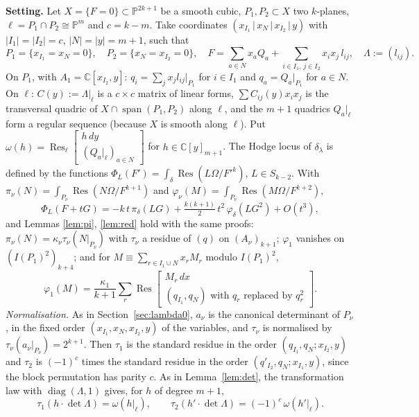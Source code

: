 \documentclass[10pt]{article}
\numberwithin{equation}{section}
\theoremstyle{remark}
\newcommand{\PP}{\mathbb{P}}
\newcommand{\CC}{\mathbb{C}}
\newcommand{\Res}{\operatorname{Res}}
\newcommand{\gres}[2]{\Res\!\begin{bmatrix} #1 \\ #2 \end{bmatrix}}
\newcommand{\lres}[2]{\Res_\ell\!\begin{bmatrix} #1 \\ #2 \end{bmatrix}}
\newcommand{\run}[1]{\medskip\noindent\textbf{#1}}
\begin{document}
\run{Setting.} Let $X=\{F=0\}\subset\PP^{2k+1}$ be a smooth cubic, $P_1,P_2\subset X$ two $k$-planes,
$\ell=P_1\cap P_2\cong\PP^m$ and $c=k-m$. Take coordinates $(x_{I_1}\,|\,x_N\,|\,x_{I_2}\,|\,y)$ with
$|I_1|=|I_2|=c$, $|N|=|y|=m+1$, such that
\begin{equation}\label{eq:Ccoords}
P_1=\{x_{I_1}=x_N=0\},\quad P_2=\{x_N=x_{I_2}=0\},\quad
F=\sum_{a\in N}x_aQ_a+\sum_{i\in I_1,\,j\in I_2}x_ix_j\,l_{ij},\quad\Lambda:=(l_{ij}).
\end{equation}
On $P_1$, with $A_1=\CC[x_{I_2},y]$: $q_i=\sum_jx_jl_{ij}|_{P_1}$ for $i\in I_1$ and $q_a=Q_a|_{P_1}$ for
$a\in N$. On $\ell$: $C(y):=\Lambda|_\ell$ is a $c\times c$ matrix of linear forms, $\sum C_{ij}(y)x_ix_j$ is the
transversal quadric of $X\cap\operatorname{span}(P_1,P_2)$ along $\ell$, and the $m+1$ quadrics $Q_a|_\ell$ form
a regular sequence (because $X$ is smooth along $\ell$). Put
$\omega(h)=\lres{h\,dy}{(Q_a|_\ell)_{a\in N}}$ for $h\in\CC[y]_{m+1}$.
The Hodge locus of $\delta_\lambda$ is defined by the functions $\Phi_L(F')=\int_\delta\Res(L\Omega/F'^k)$,
$L\in S_{k-2}$. With $\pi_\nu(N)=\int_{P_\nu}\Res(N\Omega/F^{k+1})$ and
$\varphi_\nu(M)=\int_{P_\nu}\Res(M\Omega/F^{k+2})$,
\begin{equation}\label{eq:Cexp}
\Phi_L(F+tG)=-k\,t\,\pi_\delta(LG)+\tfrac{k(k+1)}2\,t^2\,\varphi_\delta(LG^2)+O(t^3),
\end{equation}
and Lemmas \ref{lem:pi}, \ref{lem:red} hold with the same proofs: $\pi_\nu(N)=\kappa_\nu\tau_\nu(N|_{P_\nu})$
with $\tau_\nu$ a residue of $(q)$ on $(A_\nu)_{k+1}$; $\varphi_1$ vanishes on $(I(P_1)^2)_{k+4}$; and for
$M\equiv\sum_{r\in I_1\cup N}x_rM_r$ modulo $I(P_1)^2$,
\begin{equation}\label{eq:Cred}
\varphi_1(M)=\frac{\kappa_1}{k+1}\sum_r\gres{M_r\,dx}{(q_{I_1},q_N)\text{ with }q_r\text{ replaced by }q_r^2}.
\end{equation}
\emph{Normalisation.} As in Section~\ref{sec:lambda0}, $a_\nu$ is the canonical determinant of $P_\nu$, in the
fixed order $(x_{I_1},x_N,x_{I_2},y)$ of the variables, and $\tau_\nu$ is normalised by
$\tau_\nu(a_\nu|_{P_\nu})=2^{k+1}$. Then $\tau_1$ is the standard residue in the order
$(q_{I_1},q_N;x_{I_2},y)$ and $\tau_2$ is $(-1)^c$ times the standard residue in the order
$(q'_{I_2},q_N;x_{I_1},y)$, since the block permutation has parity $c$. As in Lemma~\ref{lem:det}, the
transformation law with $\operatorname{diag}(\Lambda,1)$ gives, for $h$ of degree $m+1$,
\begin{equation}\label{eq:Cdet}
\tau_1(h\cdot\det\Lambda)=\omega(h|_\ell),\qquad\tau_2(h'\cdot\det\Lambda)=(-1)^c\,\omega(h'|_\ell).
\end{equation}
\end{document}
